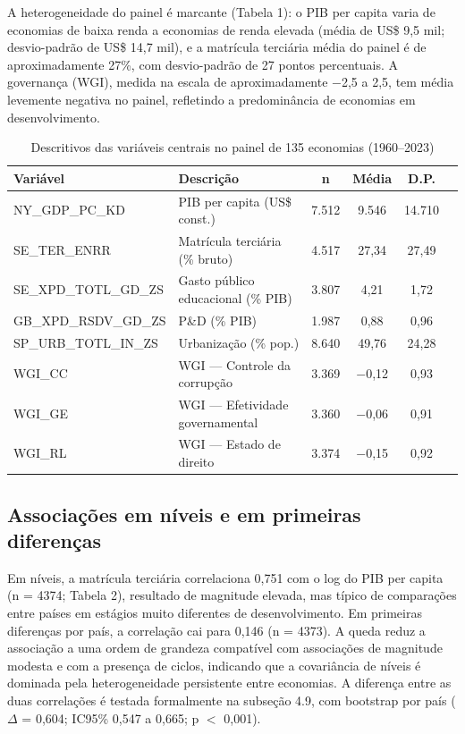 \documentclass[12pt,a4paper]{article}
\begin{document}
A heterogeneidade do painel é marcante (Tabela 1): o PIB per capita varia de economias de baixa renda a economias de renda elevada (média de US\$ 9,5 mil; desvio-padrão de US\$ 14,7 mil), e a matrícula terciária média do painel é de aproximadamente 27\%, com desvio-padrão de 27 pontos percentuais. A governança (WGI), medida na escala de aproximadamente $-$2,5 a 2,5, tem média levemente negativa no painel, refletindo a predominância de economias em desenvolvimento.

\begin{table}[htbp]
\centering
\caption{Descritivos das variáveis centrais no painel de 135 economias (1960--2023)}
\label{tab:descritivos}
\footnotesize
\begin{tabular}{>{\raggedright\arraybackslash}p{3.9cm}>{\raggedright\arraybackslash}p{4.4cm}cccc}
\toprule
Variável & Descrição & n & Média & D.P. \\
\midrule
NY\_GDP\_PC\_KD & PIB per capita (US\$ const.) & 7.512 & 9.546 & 14.710 \\
SE\_TER\_ENRR & Matrícula terciária (\% bruto) & 4.517 & 27,34 & 27,49 \\
SE\_XPD\_TOTL\_GD\_ZS & Gasto público educacional (\% PIB) & 3.807 & 4,21 & 1,72 \\
GB\_XPD\_RSDV\_GD\_ZS & P\&D (\% PIB) & 1.987 & 0,88 & 0,96 \\
SP\_URB\_TOTL\_IN\_ZS & Urbanização (\% pop.) & 8.640 & 49,76 & 24,28 \\
WGI\_CC & WGI --- Controle da corrupção & 3.369 & $-$0,12 & 0,93 \\
WGI\_GE & WGI --- Efetividade governamental & 3.360 & $-$0,06 & 0,91 \\
WGI\_RL & WGI --- Estado de direito & 3.374 & $-$0,15 & 0,92 \\
\bottomrule
\end{tabular}
\par{}
\end{table}

\subsection{Associações em níveis e em primeiras diferenças}

Em níveis, a matrícula terciária correlaciona 0,751 com o log do PIB per capita (n = 4374; Tabela 2), resultado de magnitude elevada, mas típico de comparações entre países em estágios muito diferentes de desenvolvimento. Em primeiras diferenças por país, a correlação cai para 0,146 (n = 4373). A queda reduz a associação a uma ordem de grandeza compatível com associações de magnitude modesta e com a presença de ciclos, indicando que a covariância de níveis é dominada pela heterogeneidade persistente entre economias. A diferença entre as duas correlações é testada formalmente na subseção 4.9, com bootstrap por país ($\Delta$ = 0,604; IC95\% 0,547 a 0,665; p $<$ 0,001).
\end{document}
